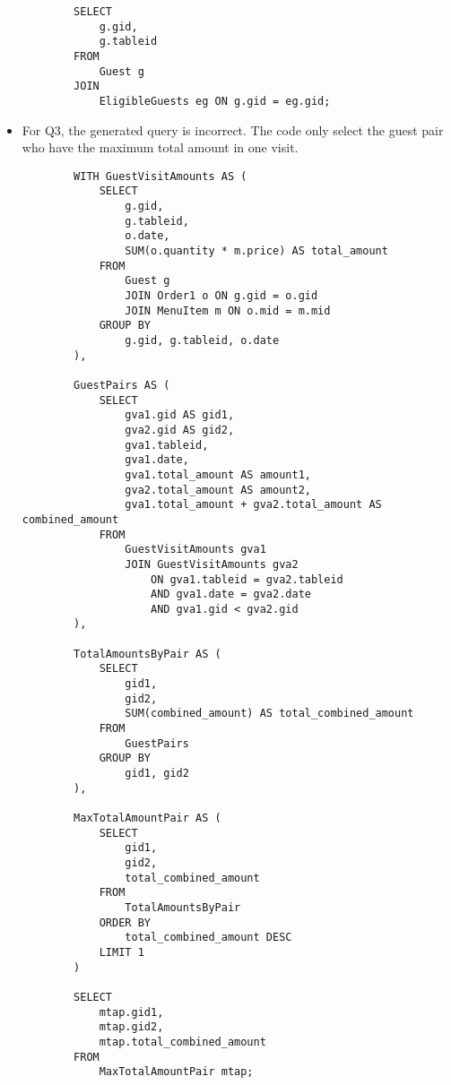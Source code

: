 \documentclass{article}
\begin{document}
\begin{itemize}
\begin{verbatim}
        SELECT 
            g.gid,
            g.tableid
        FROM 
            Guest g
        JOIN 
            EligibleGuests eg ON g.gid = eg.gid;
    \end{verbatim}
    \item For Q3, the generated query is incorrect. The code only select the guest pair who 
    have the maximum total amount in one visit. 
    \begin{verbatim}
        WITH GuestVisitAmounts AS (
            SELECT 
                g.gid,
                g.tableid,
                o.date,
                SUM(o.quantity * m.price) AS total_amount
            FROM 
                Guest g
                JOIN Order1 o ON g.gid = o.gid
                JOIN MenuItem m ON o.mid = m.mid
            GROUP BY 
                g.gid, g.tableid, o.date
        ),

        GuestPairs AS (
            SELECT 
                gva1.gid AS gid1,
                gva2.gid AS gid2,
                gva1.tableid,
                gva1.date,
                gva1.total_amount AS amount1,
                gva2.total_amount AS amount2,
                gva1.total_amount + gva2.total_amount AS combined_amount
            FROM 
                GuestVisitAmounts gva1
                JOIN GuestVisitAmounts gva2 
                    ON gva1.tableid = gva2.tableid 
                    AND gva1.date = gva2.date 
                    AND gva1.gid < gva2.gid
        ),

        TotalAmountsByPair AS (
            SELECT 
                gid1, 
                gid2, 
                SUM(combined_amount) AS total_combined_amount
            FROM 
                GuestPairs
            GROUP BY 
                gid1, gid2
        ),

        MaxTotalAmountPair AS (
            SELECT 
                gid1, 
                gid2, 
                total_combined_amount
            FROM 
                TotalAmountsByPair
            ORDER BY 
                total_combined_amount DESC
            LIMIT 1
        )

        SELECT 
            mtap.gid1, 
            mtap.gid2, 
            mtap.total_combined_amount
        FROM 
            MaxTotalAmountPair mtap;
    \end{verbatim}
\end{itemize}
\end{document}
